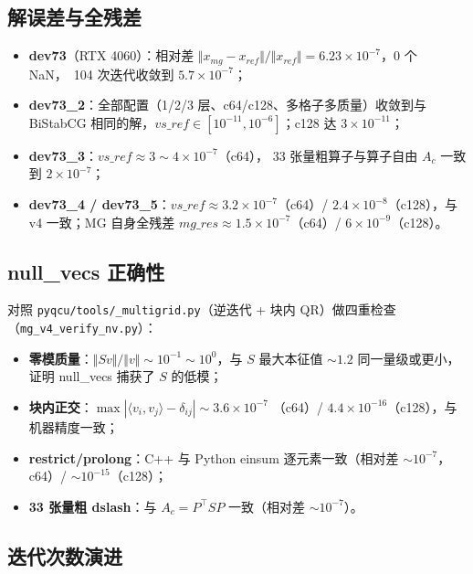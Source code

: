 \documentclass[11pt,a4paper]{article}
\begin{document}
\subsection{解误差与全残差}
\label{sec:solution}

\begin{itemize}
  \item \textbf{dev73}（RTX 4060）：相对差 $\Vert x_{mg}-x_{ref}\Vert/\Vert x_{ref}\Vert
        = 6.23\times10^{-7}$，0 个 NaN，~104 次迭代收敛到 $5.7\times10^{-7}$；
  \item \textbf{dev73\_2}：全部配置（1/2/3 层、c64/c128、多格子多质量）收敛到与
        BiStabCG 相同的解，$vs\_ref\in[10^{-11},10^{-6}]$；c128 达 $3\times10^{-11}$；
  \item \textbf{dev73\_3}：$vs\_ref\approx3\sim4\times10^{-7}$（c64），
        33 张量粗算子与算子自由 $A_c$ 一致到 $2\times10^{-7}$；
  \item \textbf{dev73\_4 / dev73\_5}：$vs\_ref\approx3.2\times10^{-7}$（c64）/
        $2.4\times10^{-8}$（c128），与 v4 一致；MG 自身全残差
        $mg\_res\approx1.5\times10^{-7}$（c64）/ $6\times10^{-9}$（c128）。
\end{itemize}

\subsection{null\_vecs 正确性}
\label{sec:nullvec}

对照 \texttt{pyqcu/tools/\_multigrid.py}（逆迭代 + 块内 QR）做四重检查
（\texttt{mg\_v4\_verify\_nv.py}）：
\begin{itemize}
  \item \textbf{零模质量}：$\Vert S v\Vert/\Vert v\Vert\sim10^{-1}\sim10^0$，与 $S$
        最大本征值 $\sim1.2$ 同一量级或更小，证明 null\_vecs 捕获了 $S$ 的低模；
  \item \textbf{块内正交}：$\max|\langle v_i,v_j\rangle-\delta_{ij}|\sim3.6\times10^{-7}$
        （c64）/ $4.4\times10^{-16}$（c128），与机器精度一致；
  \item \textbf{restrict/prolong}：C++ 与 Python einsum 逐元素一致（相对差
        $\sim10^{-7}$，c64）/ $\sim10^{-15}$（c128）；
  \item \textbf{33 张量粗 dslash}：与 $A_c=P^\top S P$ 一致（相对差 $\sim10^{-7}$）。
\end{itemize}

\subsection{迭代次数演进}
\label{sec:iterations}
\end{document}
